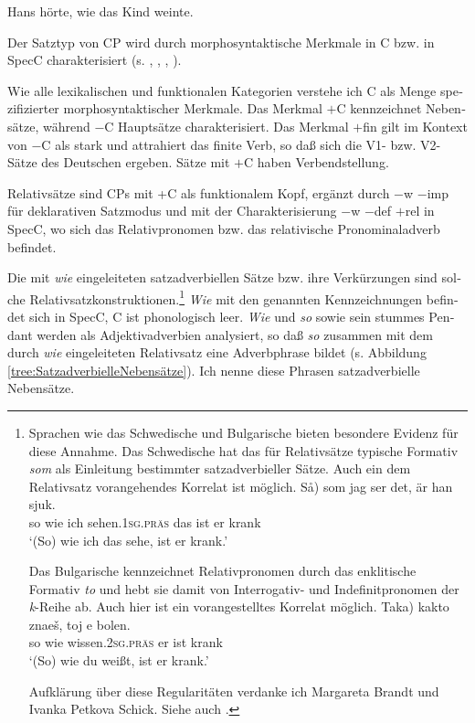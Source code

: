 \documentclass[output=paper, colorlinks, citecolor=brown, booklanguage=german]{langscibook}
\begin{document}
\begin{otherlanguage}{german}
\ea \label{ex:zi97:14} Hans hörte, wie das Kind weinte.
\z

\noindent Der Satztyp von CP wird durch morphosyntaktische Merkmale in C bzw. in SpecC charakterisiert (s. \citealt{brandt1989satzmodusmodalitatundperformativitat}, \citealt{brandt1992satztyp}, \citealt{zimmermann90}, \citealt{zimmermann1991diesubordinierendekonjunktionwie, zimmermann93, zimmermann94}).

Wie alle lexikalischen und funktionalen Kategorien verstehe ich C als Menge spezifizierter morphosyntaktischer Merkmale. Das Merkmal $+$C kennzeichnet Nebensätze, während $-$C Hauptsätze charakterisiert. Das Merkmal $+$fin gilt im Kontext von $-$C als stark und attrahiert das finite Verb, so daß sich die V1- bzw. V2-Sätze des Deutschen ergeben. Sätze mit $+$C haben Verbendstellung.

Relativsätze sind CPs mit +C als funktionalem Kopf, ergänzt durch $-$w $-$imp für deklarativen Satzmodus und mit der Charakterisierung $-$w $-$def $+$rel in SpecC, wo sich das Relativpronomen bzw. das relativische Pronominaladverb befindet.

Die mit \textit{wie} eingeleiteten satzadverbiellen Sätze bzw. ihre Verkürzungen sind solche Relativsatzkonstruktionen.\footnote{Sprachen wie das Schwedische und Bulgarische bieten besondere Evidenz für diese Annahme. Das Schwedische hat das für Relativsätze typische Formativ \textit{som} als Einleitung bestimmter satzadverbieller Sätze. Auch ein dem Relativsatz vorangehendes Korrelat ist möglich.
\ea 
\gll \minsp{(} Så) som jag ser det, är han sjuk. \\
{} so wie ich sehen.\textsc{1sg.präs} das ist er krank\\
\glt `(So) wie ich das sehe, ist er krank.'
\z

\noindent Das Bulgarische kennzeichnet Relativpronomen durch das enklitische Formativ \textit{to} und hebt sie damit von Interrogativ- und Indefinitpronomen der \textit{k}-Reihe ab. Auch hier ist ein vorangestelltes Korrelat möglich.
\ea 
\gll \minsp{(} Taka) kakto znaeš, toj e bolen. \\
{} so wie wissen.\textsc{2sg.präs} er ist krank\\
\glt `(So) wie du weißt, ist er krank.'
\z

\noindent Aufklärung über diese Regularitäten verdanke ich Margareta Brandt und Ivanka Petkova Schick. Siehe auch \citet{brandt1997derredesituierendewiesatz}%
.
} \textit{Wie} mit den genannten Kennzeichnungen befindet sich in SpecC, C ist phonologisch leer. \textit{Wie} und \textit{so} sowie sein stummes Pendant werden als Adjektivadverbien analysiert, so daß \textit{so} zusammen mit dem durch \textit{wie} eingeleiteten Relativsatz eine Adverbphrase bildet (s. Abbildung \ref{tree:SatzadverbielleNebensätze}). Ich nenne diese Phrasen satzadverbielle Nebensätze. 



\end{otherlanguage}
\end{document}

